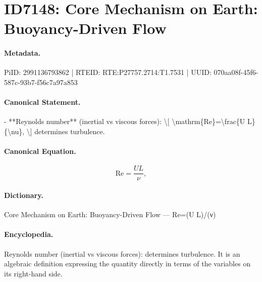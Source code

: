 \section*{ID7148: Core Mechanism on Earth: Buoyancy-Driven Flow}
\paragraph{Metadata.}
PiID: 2991136793862 | RTEID: RTE:P27757.2714:T1.7531 | UUID: 070aa08f-45f6-587c-93b7-f56c7a97a853

\paragraph{Canonical Statement.}
- **Reynolds number** (inertial vs viscous forces): \textbackslash{}[ \textbackslash{}mathrm\{Re\}=\textbackslash{}frac\{U L\}\{\textbackslash{}nu\}, \textbackslash{}] determines turbulence.

\paragraph{Canonical Equation.}
\[
\mathrm{Re}=\frac{U L}{\nu},
\]

\paragraph{Dictionary.}
Core Mechanism on Earth: Buoyancy-Driven Flow — Re=(U L)/(ν)

\paragraph{Encyclopedia.}
Reynolds number (inertial vs viscous forces): determines turbulence. It is an algebraic definition expressing the quantity directly in terms of the variables on its right-hand side.
